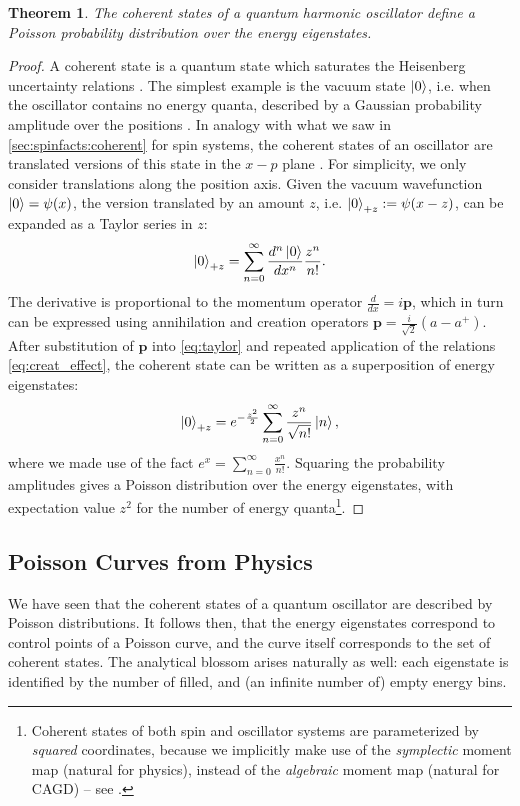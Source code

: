 \documentclass[final,3p,mathptmx]{elsarticle}
\newtheorem{theorem}{Theorem}
\begin{document}
\begin{theorem}
	The coherent states of a quantum harmonic oscillator define a Poisson probability distribution over the energy eigenstates.
\end{theorem}
\begin{proof}
	A coherent state is a quantum state which saturates the Heisenberg uncertainty relations \cite{gazeau2009coherent}. The simplest example is the vacuum state $\ket{0}$, i.e. when the oscillator contains no energy quanta, described by a Gaussian probability amplitude over the positions \cite{townsend2000modern}. In analogy with what we saw in \autoref{sec:spinfacts:coherent} for spin systems, the coherent states of an oscillator are translated versions of this state in the $x-p$ plane \cite{gazeau2009coherent}. For simplicity, we only consider translations along the position axis. Given the vacuum wavefunction $\ket{0} = \psi(x)$, the version translated by an amount $z$, i.e. $\ket{0}_{+z} := \psi(x-z)$, can be expanded as a Taylor series in $z$:
	\begin{align}\label{eq:taylor}
	\ket{0}_{+z} = \sum_{n = 0}^{\infty}\frac{d^{n}\ket{0}}{dx^{n}}\frac{z^{n}}{n!}.
	\end{align}   
	The derivative is proportional to the momentum operator $\frac{d}{dx} = i\mathbf{p}$, which in turn can be expressed using annihilation and creation operators $\mathbf{p} = \frac{i}{\sqrt{2}}(a - a^{+})$. After substitution of $\mathbf{p}$ into \eqref{eq:taylor} and repeated application of the relations \eqref{eq:creat_effect}, the coherent state can be written as a superposition of energy eigenstates:
	\begin{align}
	\ket{0}_{+z} = e^{-\frac{z^{2}}{2}}\sum_{n = 0}^{\infty}\frac{z^{n}}{\sqrt{n!}}\ket{n},
	\end{align}
	where we made use of the fact $e^{x} = \sum_{n=0}^{\infty}\frac{x^{n}}{n!}$. 
	Squaring the probability amplitudes gives a Poisson distribution over the energy eigenstates, with expectation value $z^{2}$ for the number of energy quanta\footnote{Coherent states of both spin and oscillator systems are parameterized by \emph{squared} coordinates, because we implicitly make use of the \emph{symplectic} moment map (natural for physics), instead of the \emph{algebraic} moment map (natural for CAGD) -- see  \cite{sottile2003toric}.}. 
\end{proof}

\subsection{Poisson Curves from Physics}
We have seen that the coherent states of a quantum oscillator are described by Poisson distributions. It follows then, that the energy eigenstates correspond to control points of a Poisson curve, and the curve itself corresponds to the set of coherent states. The analytical blossom arises naturally as well: each eigenstate is identified by the number of filled, and (an infinite number of) empty energy bins. 
\end{document}
